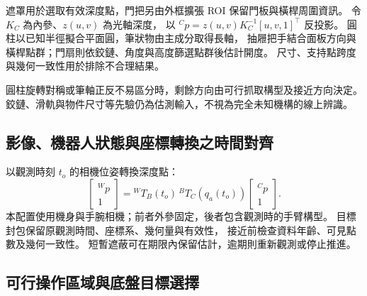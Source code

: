 遮罩用於選取有效深度點，門把另由外框擴張 ROI 保留門板與橫桿周圍資訊。
令 $K_C$ 為內參、$z(u,v)$ 為光軸深度，
以 $ {}^Cp=z(u,v)K_C^{-1}[u,v,1]^\top$ 反投影。
圓柱以已知半徑擬合平面圓，筆狀物由主成分取得長軸，
抽屜把手結合面板方向與橫桿點群；門扇則依鉸鏈、角度與高度篩選點群後估計開度。
尺寸、支持點跨度與幾何一致性用於排除不合理結果。

圓柱旋轉對稱或筆軸正反不易區分時，剩餘方向由可行抓取構型及接近方向決定。
鉸鏈、滑軌與物件尺寸等先驗仍為估測輸入，不視為完全未知機構的線上辨識。

\subsection{影像、機器人狀態與座標轉換之時間對齊}
\label{subsec:visual_state_time_alignment}

以觀測時刻 $t_o$ 的相機位姿轉換深度點：
\begin{equation}
    \begin{bmatrix}{}^Wp\\1\end{bmatrix}
    ={}^WT_B(t_o)\,{}^BT_C(q_a(t_o))
    \begin{bmatrix}{}^Cp\\1\end{bmatrix}.
    \label{eq:ch3_visual_timestamp_transform}
\end{equation}
本配置使用機身與手腕相機；前者外參固定，後者包含觀測時的手臂構型。
目標封包保留原觀測時間、座標系、幾何量與有效性，
接近前檢查資料年齡、可見點數及幾何一致性。
短暫遮蔽可在期限內保留估計，逾期則重新觀測或停止推進。

\subsection{可行操作區域與底盤目標選擇}
\label{subsec:feasible_operation_base_selection}

